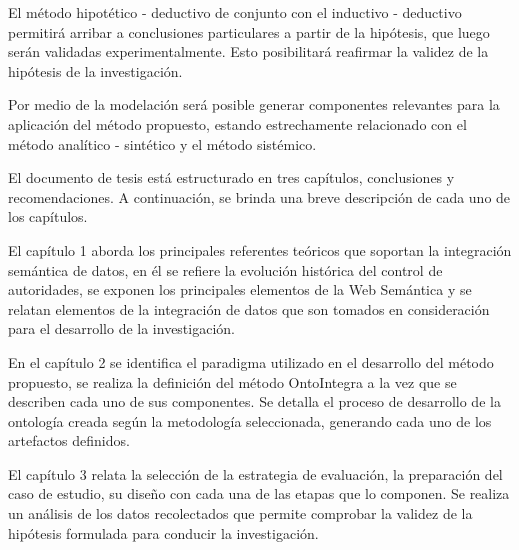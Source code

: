 El método hipotético - deductivo de conjunto con el inductivo - deductivo permitirá arribar a conclusiones particulares a partir de la hipótesis, que luego serán validadas experimentalmente. Esto posibilitará reafirmar la validez de la hipótesis de la investigación.

Por medio de la modelación será posible generar componentes relevantes para la aplicación del método propuesto, estando estrechamente relacionado con el método analítico - sintético y el método sistémico.

El documento de tesis está estructurado en tres capítulos, conclusiones y recomendaciones. A continuación, se brinda una breve descripción de cada uno de los capítulos.

El capítulo 1 aborda los principales referentes teóricos que soportan la integración semántica de datos, en él se refiere la evolución histórica del control de autoridades, se exponen los principales elementos de la Web Semántica y se relatan elementos de la integración de datos que son tomados en consideración para el desarrollo de la investigación.

En el capítulo 2 se identifica el paradigma utilizado en el desarrollo del método propuesto, se realiza la definición del método OntoIntegra a la vez que se describen cada uno de sus componentes. Se detalla el proceso de desarrollo de la ontología creada según la metodología seleccionada, generando cada uno de los artefactos definidos.

El capítulo 3 relata la selección de la estrategia de evaluación, la preparación del caso de estudio, su diseño con cada una de las etapas que lo componen. Se realiza un análisis de los datos recolectados que permite comprobar la validez de la hipótesis formulada para conducir la investigación.